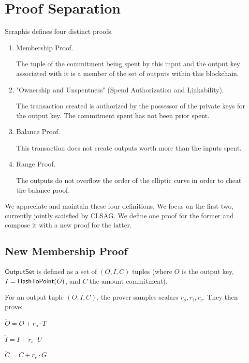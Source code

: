 \documentclass[]{article}
\begin{document}
\newpage

\section{Proof Separation}

Seraphis defines four distinct proofs.

\begin{enumerate}
	\item
	Membership Proof.
	
	The tuple of the commitment being spent by this input and the output key associated with it is a member of the set of outputs within this blockchain.

	\item "Ownership and Unspentness" (Spend Authorization and Linkability).
	
	The transaction created is authorized by the possessor of the private keys for the output key. The commitment spent has not been prior spent.
	
	\item
	Balance Proof.
	
	This transaction does not create outputs worth more than the inputs spent.
	
	\item
	Range Proof.
	
	The outputs do not overflow the order of the elliptic curve in order to cheat the balance proof.
\end{enumerate}

We appreciate and maintain these four definitions. We focus on the first two, currently jointly satisfied by CLSAG. We define one proof for the former and compose it with a new proof for the latter.

\subsection{New Membership Proof}

$\mathsf{OutputSet}$ is defined as a set of $(O, I, C)$ tuples (where $O$ is the output key, $I = \mathsf{HashToPoint}(O)$, and $C$ the amount commitment). 

For an output tuple $(O, I, C)$, the prover samples scalars $r_o, r_i, r_c$. They then prove:

$\tilde{O} = O + r_o \cdot T$

$\tilde{I} = I + r_i \cdot U$

$\tilde{C} = C + r_c \cdot G$
\end{document}

